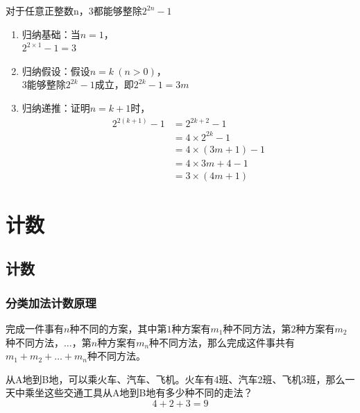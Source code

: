 \documentclass[12pt, openany, oneside]{book}
\begin{document}
\begin{tcolorbox}
	对于任意正整数n，3都能够整除$ 2^{2n} - 1 $
	\begin{enumerate}
		\item 归纳基础：当$ n = 1 $，\\
		      $ 2^{2 \times 1} -1 = 3 $

		\item 归纳假设：假设$ n = k\ (n > 0) $，\\
		      3能够整除$ 2^{2k} - 1 $成立，即$ 2^{2k} - 1 = 3m $

		\item 归纳递推：证明$ n = k + 1 $时，
		      \begin{align*}
			      2^{2(k+1)} - 1 & = 2^{2k+2} - 1          \\
			                     & = 4 \times 2^{2k} - 1   \\
			                     & = 4 \times (3m + 1) - 1 \\
			                     & = 4 \times 3m + 4 - 1   \\
			                     & =3 \times (4m + 1)
		      \end{align*}
	\end{enumerate}
\end{tcolorbox}

\newpage

\chapter{计数}

\section{计数}

\subsection{分类加法计数原理}

完成一件事有$ n $种不同的方案，其中第$ 1 $种方案有$ m_1 $种不同方法，第$ 2 $种方案有$ m_2 $种不同方法，$ \dots $，第$ n $种方案有$ m_n $种不同方法，那么完成这件事共有$ m_1 + m_2 + \dots + m_n $种不同方法。

\begin{tcolorbox}
	从A地到B地，可以乘火车、汽车、飞机。火车有4班、汽车2班、飞机3班，那么一天中乘坐这些交通工具从A地到B地有多少种不同的走法？
	$$
		4 + 2 + 3 = 9
	$$
\end{tcolorbox}
\end{document}
